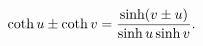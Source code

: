 \[\mathop{\coth\/}\nolimits u\pm\mathop{\coth\/}\nolimits v=\frac{\mathop{\sinh%
\/}\nolimits\!\left(v\pm u\right)}{\mathop{\sinh\/}\nolimits u\mathop{\sinh\/}%
\nolimits v}.\]